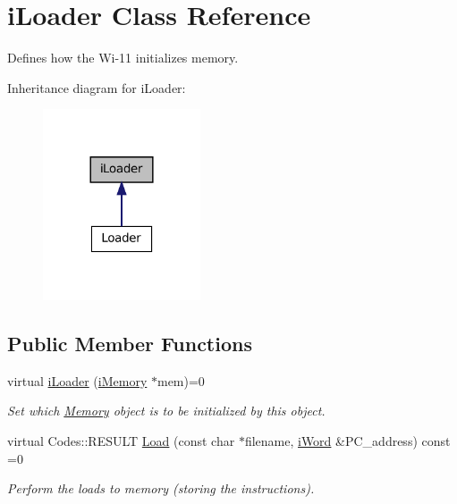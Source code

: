 \hypertarget{classiLoader}{
\section{iLoader Class Reference}
\label{classiLoader}
}


Defines how the Wi-\/11 initializes memory.  




Inheritance diagram for iLoader:
\nopagebreak
\begin{figure}[H]
\begin{center}
\leavevmode
\includegraphics[width=132pt]{classiLoader__inherit__graph}
\end{center}
\end{figure}
\subsection*{Public Member Functions}
\begin{DoxyCompactItemize}
\item 
virtual \hyperlink{classiLoader_aeb68364c9e80d9dc5cb0f0299073c719}{iLoader} (\hyperlink{classiMemory}{iMemory} $\ast$mem)=0
\begin{DoxyCompactList}\small\item\em Set which \hyperlink{classMemory}{Memory} object is to be initialized by this object. \item\end{DoxyCompactList}\item 
virtual Codes::RESULT \hyperlink{classiLoader_a012bf942ef5210dd8797e1a20d8c5e13}{Load} (const char $\ast$filename, \hyperlink{classiWord}{iWord} \&PC\_\-address) const =0
\begin{DoxyCompactList}\small\item\em Perform the loads to memory (storing the instructions). \item\end{DoxyCompactList}\end{DoxyCompactItemize}


